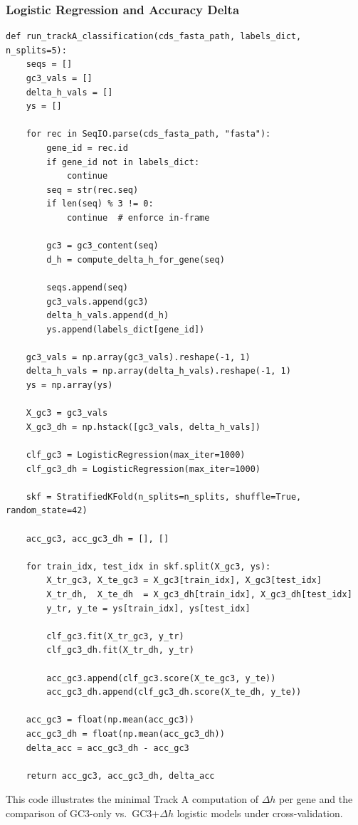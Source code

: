 \documentclass[11pt]{article}
\begin{document}
\subsubsection{Logistic Regression and Accuracy Delta}

\begin{verbatim}
def run_trackA_classification(cds_fasta_path, labels_dict, n_splits=5):
    seqs = []
    gc3_vals = []
    delta_h_vals = []
    ys = []

    for rec in SeqIO.parse(cds_fasta_path, "fasta"):
        gene_id = rec.id
        if gene_id not in labels_dict:
            continue
        seq = str(rec.seq)
        if len(seq) % 3 != 0:
            continue  # enforce in-frame

        gc3 = gc3_content(seq)
        d_h = compute_delta_h_for_gene(seq)

        seqs.append(seq)
        gc3_vals.append(gc3)
        delta_h_vals.append(d_h)
        ys.append(labels_dict[gene_id])

    gc3_vals = np.array(gc3_vals).reshape(-1, 1)
    delta_h_vals = np.array(delta_h_vals).reshape(-1, 1)
    ys = np.array(ys)

    X_gc3 = gc3_vals
    X_gc3_dh = np.hstack([gc3_vals, delta_h_vals])

    clf_gc3 = LogisticRegression(max_iter=1000)
    clf_gc3_dh = LogisticRegression(max_iter=1000)

    skf = StratifiedKFold(n_splits=n_splits, shuffle=True, random_state=42)

    acc_gc3, acc_gc3_dh = [], []

    for train_idx, test_idx in skf.split(X_gc3, ys):
        X_tr_gc3, X_te_gc3 = X_gc3[train_idx], X_gc3[test_idx]
        X_tr_dh,  X_te_dh  = X_gc3_dh[train_idx], X_gc3_dh[test_idx]
        y_tr, y_te = ys[train_idx], ys[test_idx]

        clf_gc3.fit(X_tr_gc3, y_tr)
        clf_gc3_dh.fit(X_tr_dh, y_tr)

        acc_gc3.append(clf_gc3.score(X_te_gc3, y_te))
        acc_gc3_dh.append(clf_gc3_dh.score(X_te_dh, y_te))

    acc_gc3 = float(np.mean(acc_gc3))
    acc_gc3_dh = float(np.mean(acc_gc3_dh))
    delta_acc = acc_gc3_dh - acc_gc3

    return acc_gc3, acc_gc3_dh, delta_acc
\end{verbatim}

This code illustrates the minimal Track A computation of \(\Delta h\) per gene and the comparison of GC3-only vs.\ GC3+\(\Delta h\) logistic models under cross-validation.
\end{document}
